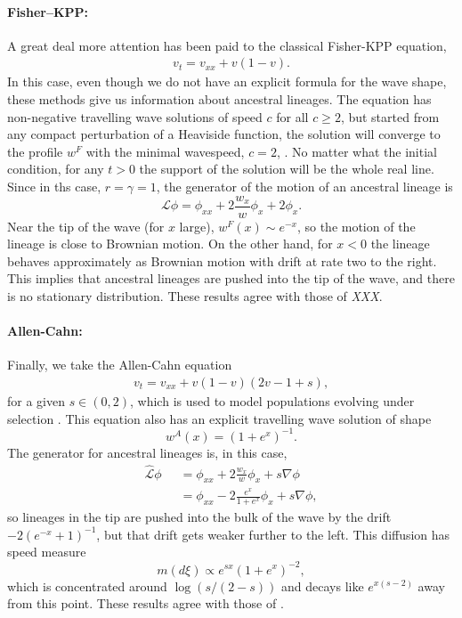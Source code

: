 \documentclass[12pt]{article}
\def \hat{\widehat}
\newcommand{\Lgen}{\mathcal{L}}    %
\newcommand{\comment}[1]{{\color{blue} \it #1}}
\begin{document}
\paragraph{Fisher--KPP:}
A great deal more attention has been paid to the classical Fisher-KPP equation,
\begin{align} \label{eqn:fkpp}
    v_t = v_{xx} + v (1-v) .
\end{align}
In this case,
even though we do not have an explicit formula for the wave shape,
these methods give us information about ancestral lineages.
The equation has non-negative travelling wave solutions of speed $c$ for all $c \geq 2$, 
but started from any compact perturbation of a Heaviside function, the 
solution will converge to the profile $w^F$ with the minimal wavespeed, $c=2$,
\cite{kolmogorov/petrovsky/piscounov:1937,ramson:1983}.
No matter what the initial condition,
for any $t>0$ the support of the 
solution will be the whole real line. 
Since in ths case, $r = \gamma = 1$,
the generator of the motion of an ancestral lineage is
$$
    \Lgen \phi
    =
    \phi_{xx} + 2 \frac{w_x}{w} \phi_x + 2 \phi_x .
$$
Near the tip of the wave (for $x$ large), $w^F(x) \sim e^{-x}$,
so the motion of the lineage is close to Brownian motion.
On the other hand, for $x < 0$ the lineage behaves approximately as
Brownian motion with drift at rate two to the right.
This implies that
ancestral lineages are pushed into the tip of the wave,
and there is no stationary distribution.
These results agree with those of \comment{XXX}.


\paragraph{Allen-Cahn:}
Finally, we take the Allen-Cahn equation
\begin{align} \label{eqn:allen_cahn}
    v_t = v_{xx} + v(1-v)(2v-1+s),
\end{align}
for a given $s \in (0,2)$,
which is used to model populations evolving under selection \cite{Sarah}.
This equation also has an explicit travelling wave solution
of shape
\[ w^A(x) = (1+e^{x})^{-1}. \]
The generator for ancestral lineages is, in this case,
\begin{align*}
    \hat{\mathcal{L}}\phi
    &=
    \phi_{xx}
    + 
    2 \frac{w_x}{w} \phi_x
    +
    s \nabla \phi \\
    \qquad &=
    \phi_{xx}
    -
    2 \frac{e^x}{1+e^x} \phi_x 
    + 
    s \nabla \phi,
\end{align*}
so lineages in the tip are pushed into the bulk of the wave by the drift $-2(e^{-x}+1)^{-1}$,
but that drift gets weaker further to the left.
This diffusion has speed measure
$$
    m(d\xi) \propto e^{sx}(1+e^x)^{-2},
$$
which is concentrated around $\log(s/(2-s))$ and decays like $e^{x(s-2)}$ away from this point.
These results agree with those of \cite{etheridge/penington:2020}.
\end{document}
